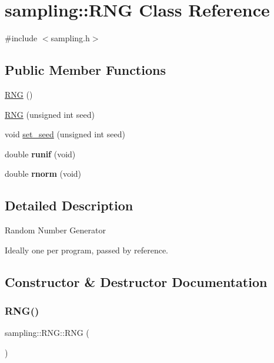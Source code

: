 \hypertarget{classsampling_1_1RNG}{}\section{sampling\+:\+:R\+NG Class Reference}
\label{classsampling_1_1RNG}


{\ttfamily \#include $<$sampling.\+h$>$}

\subsection*{Public Member Functions}
\begin{DoxyCompactItemize}
\item 
\hyperlink{classsampling_1_1RNG_ae61ad8991680f68b8c144a03a09a767a}{R\+NG} ()
\item 
\hyperlink{classsampling_1_1RNG_a2fa1a6176fc0fbc96a5c4a4ead6d7927}{R\+NG} (unsigned int seed)
\item 
void \hyperlink{classsampling_1_1RNG_ad739124235d7d9bbe31f86d37f2fb9e5}{set\+\_\+seed} (unsigned int seed)
\item 
\mbox{\label{classsampling_1_1RNG_aec538d8d9798abae38de908f69784421}} 
double {\bfseries runif} (void)
\item 
\mbox{\label{classsampling_1_1RNG_af16b7ef97abf5c1e5cd03f301bbdb8b2}} 
double {\bfseries rnorm} (void)
\end{DoxyCompactItemize}


\subsection{Detailed Description}
Random Number Generator

Ideally one per program, passed by reference. 

\subsection{Constructor \& Destructor Documentation}
\mbox{\label{classsampling_1_1RNG_ae61ad8991680f68b8c144a03a09a767a}} 
\subsubsection{\texorpdfstring{R\+N\+G()}{RNG()}\hspace{0.1cm}{\footnotesize\ttfamily [1/2]}}
{\footnotesize\ttfamily sampling\+::\+R\+N\+G\+::\+R\+NG (\begin{DoxyParamCaption}{ }\end{DoxyParamCaption})}

